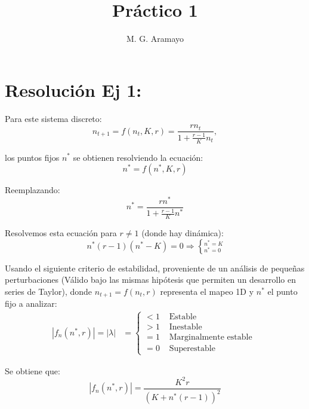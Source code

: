 \documentclass[twocolumn,aps,prl]{revtex4-1}
\newcommand{\nstar}{n^*}
\begin{document}

\title{Práctico 1}
\author{M. G. Aramayo}


\maketitle



\section{Resolución Ej 1:}

Para este sistema discreto: 
$$n_{t+1} = f(n_t, K, r)= \frac{r n_t}{1+\frac{r-1}{K} n_t},$$ 

los puntos fijos $n^*$ se obtienen resolviendo la ecuación:
$$
n^* = f(n^*, K, r)
$$

Reemplazando:
$$
\nstar = \frac{r \nstar}{1+\frac{r-1}{K} \nstar}
$$


Resolvemos esta ecuación para $r\neq 1$ (donde hay dinámica):
$$
\nstar (r-1) (\nstar-K) = 0 \Rightarrow \left\lbrace ^{\nstar = K} _{\nstar = 0}  \right .
$$

Usando el siguiente criterio de estabilidad, proveniente de un análisis de pequeñas perturbaciones (Válido bajo las mismas hipótesis que permiten un desarrollo en series de Taylor), donde $n_{t+1} = f(n_t,r)$ representa el mapeo 1D y $\nstar$ el punto fijo a analizar:
$$
\begin{aligned}
|f_{n}\left(n^{*},r\right)| = |\lambda| &=\left\{\begin{array}{ll}
<1 & \text { Estable } \\
>1 & \text { Inestable } \\
=1 & \text { Marginalmente estable } \\
=0 & \text { Superestable }
\end{array}\right.
\end{aligned}
$$

Se obtiene que:
$$
|f_{n}\left(n^{*},r\right)|=\frac{K^{2} r}{(K+\nstar(r-1))^{2}}
$$
\end{document}
